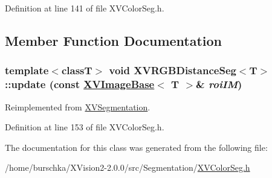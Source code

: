 Definition at line 141 of file XVColor\-Seg.h.

\subsection{Member Function Documentation}
\label{XVRGBDistanceSeg_a1}
\hypertarget{class_XVRGBDistanceSeg_a1}{
\subsubsection[update]{\setlength{\rightskip}{0pt plus 5cm}template$<$classT$>$ void XVRGBDistance\-Seg$<$T$>$::update (const \hyperlink{class_XVImageBase}{XVImage\-Base}$<$ T $>$\& {\em roi\-IM})}}




Reimplemented from \hyperlink{class_XVSegmentation}{XVSegmentation}.

Definition at line 153 of file XVColor\-Seg.h.

The documentation for this class was generated from the following file:\begin{CompactItemize}
\item 
/home/burschka/XVision2-2.0.0/src/Segmentation/\hyperlink{XVColorSeg.h-source}{XVColor\-Seg.h}\end{CompactItemize}
